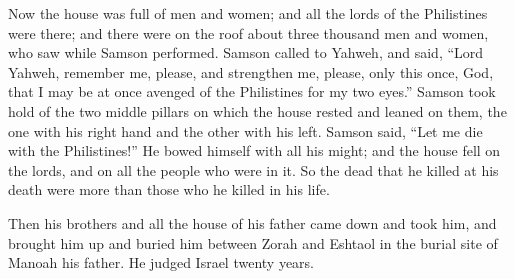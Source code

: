 {Now the house was full of men and women; and all the lords of the Philistines were there; and there were on the roof about three thousand men and women, who saw while Samson performed.
Samson called to Yahweh, and said, “Lord Yahweh, remember me, please, and strengthen me, please, only this once, God, that I may be at once avenged of the Philistines for my two eyes.”
Samson took hold of the two middle pillars on which the house rested and leaned on them, the one with his right hand and the other with his left.
Samson said, “Let me die with the Philistines!” He bowed himself with all his might; and the house fell on the lords, and on all the people who were in it. So the dead that he killed at his death were more than those who he killed in his life.
\par }{\PP {}Then his brothers and all the house of his father came down and took him, and brought him up and buried him between Zorah and Eshtaol in the burial site of Manoah his father. He judged Israel twenty years.

}
